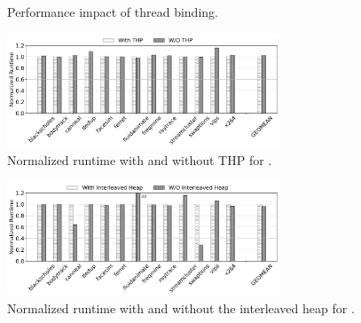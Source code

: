\begin{figure}[!h]
\centering
{}

\caption{Performance impact of thread binding.}
\label{binding-pthread-scalibity}
\end{figure}

\begin{figure}[!ht]
    \centering
    \includegraphics[width=3.2in]{SC2022/figure/hugepage.jpg}
    \caption{Normalized runtime with and without THP for \NM{}.  \label{fig:hugepage}}
\end{figure}

\begin{figure}[!ht]
    \centering
    \includegraphics[width=3.2in]{SC2022/figure/interleavedheap.jpg}
    \caption{Normalized runtime with and without the interleaved heap for \NM{}.  \label{fig:interleavedheap}}
\end{figure}


